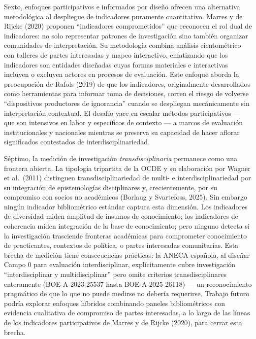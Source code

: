 \documentclass[
]{article}
\begin{document}
Sexto, enfoques participativos e informados por diseño ofrecen una
alternativa metodológica al despliegue de indicadores puramente
cuantitativo. Marres y de Rijcke (2020) proponen ``indicadores
comprometidos'' que reconocen el rol dual de indicadores: no solo
representar patrones de investigación sino también organizar comunidades
de interpretación. Su metodología combina análisis cientométrico con
talleres de partes interesadas y mapeo interactivo, enfatizando que los
indicadores son entidades diseñadas cuyas formas materiales e
interactivas incluyen o excluyen actores en procesos de evaluación. Este
enfoque aborda la preocupación de Rafols (2019) de que los indicadores,
originalmente desarrollados como herramientas para informar toma de
decisiones, corren el riesgo de volverse ``dispositivos productores de
ignorancia'' cuando se despliegan mecánicamente sin interpretación
contextual. El desafío yace en escalar métodos participativos --- que
son intensivos en labor y específicos de contexto --- a marcos de
evaluación institucionales y nacionales mientras se preserva su
capacidad de hacer aflorar significados contestados de
interdisciplinariedad.

Séptimo, la medición de investigación \emph{transdisciplinaria}
permanece como una frontera abierta. La tipología tripartita de la OCDE
y su elaboración por Wagner et al.~(2011) distinguen
transdisciplinariedad de multi- e interdisciplinariedad por su
integración de epistemologías disciplinares y, crecientemente, por su
compromiso con socios no académicos (Borlaug y Svartefoss, 2025). Sin
embargo ningún indicador bibliométrico estándar captura esta dimensión.
Los indicadores de diversidad miden amplitud de insumos de conocimiento;
los indicadores de coherencia miden integración de la base de
conocimiento; pero ninguno detecta si la investigación trasciende
fronteras académicas para comprometer conocimiento de practicantes,
contextos de política, o partes interesadas comunitarias. Esta brecha de
medición tiene consecuencias prácticas: la ANECA española, al diseñar
Campo 0 para evaluación interdisciplinar, explícitamente cubre
investigación ``interdisciplinar y multidisciplinar'' pero omite
criterios transdisciplinares enteramente (BOE-A-2023-25537 hasta
BOE-A-2025-26118) --- un reconocimiento pragmático de que lo que no
puede medirse no debería requerirse. Trabajo futuro podría explorar
enfoques híbridos combinando paneles bibliométricos con evidencia
cualitativa de compromiso de partes interesadas, a lo largo de las
líneas de los indicadores participativos de Marres y de Rijcke (2020),
para cerrar esta brecha.
\end{document}
